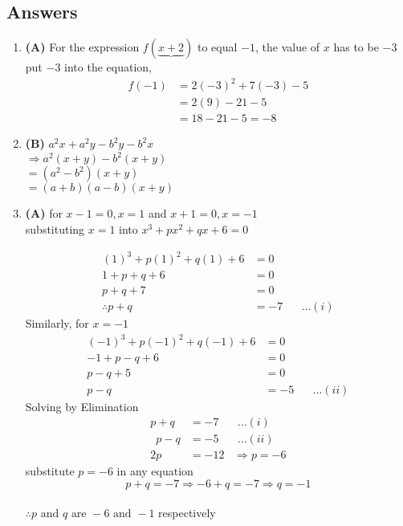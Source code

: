 \subsection{Answers}
\begin{multicols}{2}
\begin{enumerate}[label={\textbf{\arabic*.}}]
\item \textbf{(A)} For the expression $f(\underbrace{x + 2})$ to equal $-1$, the value of  $x$ has to be $-3$ \\ 
put $-3$ into the equation,   
    \begin{align*}
     f(-1) &= 2(-3)^2 + 7(-3) - 5 \\
     &= 2(9) - 21 - 5 \\
     &= 18 - 21 - 5 = -8
    \end{align*}
\item \textbf{(B)} $a^2x + a^2y - b^2y - b^2x $ \\
        $\Rightarrow a^2(x + y) -b^2(x + y) $ \\
        $= (a^2 - b^2)(x + y) $ \\
        $=(a + b)(a - b) (x + y)$
\item \textbf{(A)} for $x-1 = 0, x = 1 $ and $ x+1=0, x = -1$ \\
    substituting $x = 1$ into $x^3 + px^2 + qx + 6 = 0$ 

    \begin{align*}
    (1)^3 + p(1)^2 + q(1) + 6 &= 0 \\
    1+ p + q + 6 &= 0 \\
    p + q + 7 &= 0 \\
    \therefore p + q &= -7 \hspace{20pt} ...(i)
    \end{align*}
    Similarly, for $x = -1$
    \begin{align*}
        (-1)^3 + p(-1)^2 + q(-1) + 6 &= 0 \\
        -1+ p - q + 6 &= 0 \\
        p - q + 5 &= 0 \\
       p - q &= -5 \hspace{20pt} ...(ii)
        \end{align*}
    Solving by Elimination
    \begin{align*}
        p + q &= -7 \hspace{20pt} ...(i)\\
       \hspace{6pt} p - q &= -5  \hspace{20pt} ...(ii)\\
        2p &= -12 \hspace{10pt} \Rightarrow  p = -6
    \end{align*}
    substitute $p = -6$ in any equation \\
        $$p + q = -7 \Rightarrow -6 + q = -7 \Rightarrow q =  -1$$ \\
    $\therefore p \text{ and } q \text{ are } -6 \text{ and } -1$ respectively
    


\end{enumerate}
\end{multicols}
